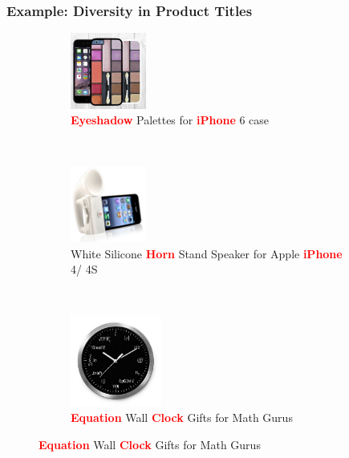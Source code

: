 \documentclass{beamer}
\begin{document}
\begin{frame}
\frametitle{Example: Diversity in Product Titles}
\begin{figure}
\label{fig:ebay-products}
        \centering
         \begin{subfigure}[b]{0.3\textwidth}
        	        \centering
                \includegraphics[width=25mm]{figures/eyeshadow-iphone-case.jpg}
                \caption{\textcolor{red}{{\bf Eyeshadow}} Palettes for \textcolor{red}{{\bf iPhone}} 6 case}
                \label{fig:eyeshadow-iphone-case}
        \end{subfigure}
              ~ %
        \begin{subfigure}[b]{0.3\textwidth}
		 \centering
                \includegraphics[width=25mm]{figures/horn-iphone-speaker.jpg}
\caption{White Silicone \textcolor{red}{{\bf Horn}} Stand Speaker for Apple \textcolor{red}{{\bf iPhone}} 4/ 4S}                \label{fig:zeppelin-speaker}
        \end{subfigure}
       ~ %
        \begin{subfigure}[b]{0.3\textwidth}
		 \centering
                \includegraphics[width=30mm]{figures/geeky-clock.jpg}
\caption{\textcolor{red}{{\bf Equation}} Wall \textcolor{red}{{\bf
      Clock}} Gifts for Math Gurus}                
\label{fig:geeky-clock}
        \end{subfigure}
\end{figure}
\end{frame}
\end{document}
